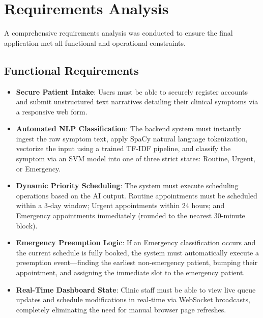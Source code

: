 \documentclass[12pt,a4paper]{report}
\begin{document}
\section{Requirements Analysis}
A comprehensive requirements analysis was conducted to ensure the final application met all functional and operational constraints.

\subsection{Functional Requirements}
\begin{itemize}
    \item \textbf{Secure Patient Intake}: Users must be able to securely register accounts and submit unstructured text narratives detailing their clinical symptoms via a responsive web form.
    \item \textbf{Automated NLP Classification}: The backend system must instantly ingest the raw symptom text, apply SpaCy natural language tokenization, vectorize the input using a trained TF-IDF pipeline, and classify the symptom via an SVM model into one of three strict states: Routine, Urgent, or Emergency.
    \item \textbf{Dynamic Priority Scheduling}: The system must execute scheduling operations based on the AI output. Routine appointments must be scheduled within a 3-day window; Urgent appointments within 24 hours; and Emergency appointments immediately (rounded to the nearest 30-minute block).
    \item \textbf{Emergency Preemption Logic}: If an Emergency classification occurs and the current schedule is fully booked, the system must automatically execute a preemption event—finding the earliest non-emergency patient, bumping their appointment, and assigning the immediate slot to the emergency patient.
    \item \textbf{Real-Time Dashboard State}: Clinic staff must be able to view live queue updates and schedule modifications in real-time via WebSocket broadcasts, completely eliminating the need for manual browser page refreshes.
\end{itemize}
\end{document}
